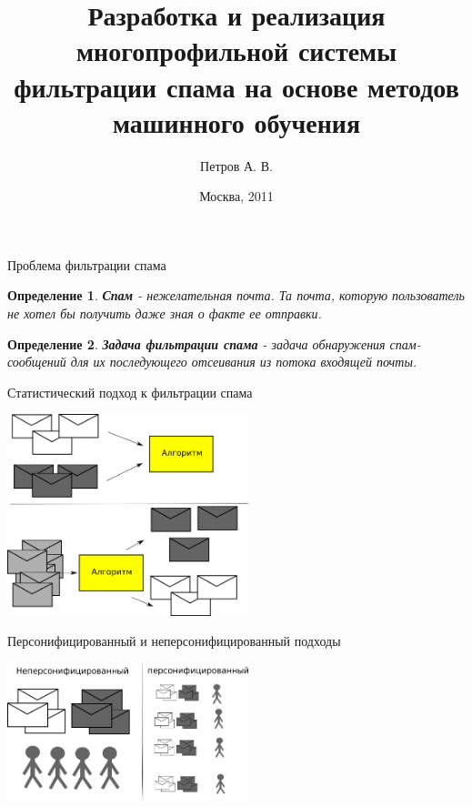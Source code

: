 \documentclass{beamer}
\newtheorem{define}{Определение}
\begin{document}
\title{Разработка и реализация многопрофильной системы фильтрации спама на основе методов машинного обучения}
\author{Петров А. В.}
\date{Москва, 2011}

\titlegraphic{\rule{3cm}{2cm}}
\begin{frame}{Проблема фильтрации спама}
    \begin{define}
        \textbf{Спам} - нежелательная почта. Та почта, которую пользователь не хотел бы получить даже зная о факте ее отправки.
    \end{define}
	\begin{define}
		\textbf{Задача фильтрации спама} - задача обнаружения спам-сообщений для их последующего отсеивания из потока входящей почты.
	\end{define}
\end{frame}

\begin{frame}{Статистический подход к фильтрации спама}
\begin{center}
    \includegraphics[width=7cm]{img/statmethod}
\end{center}
\end{frame}


\begin{frame}{Персонифицированный и неперсонифицированный подходы}
\begin{center}
    \includegraphics[width=7cm]{img/pers_nopers}
\end{center}
\end{frame}
\end{document}
